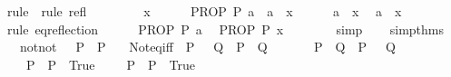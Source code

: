 \begin{isabellebody}
\ {\isacharparenleft}{\kern0pt}rule\ {\isacharasterisk}{\kern0pt}{\isacharparenright}{\kern0pt}\ {\isacharparenleft}{\kern0pt}rule\ refl{\isacharparenright}{\kern0pt}\isanewline
\ \ \isamarkupfalse%
\isanewline
\ \ \ \ \isamarkupfalse%
\ x\isanewline
\ \ \ \ \isamarkupfalse%
\ {\isacartoucheopen}PROP\ P\ a{\isacartoucheclose}\ \ {\isacartoucheopen}a\ {\isacharequal}{\kern0pt}\ x{\isacartoucheclose}\isanewline
\ \ \ \ \isamarkupfalse%
\ {\isacartoucheopen}a\ {\isacharequal}{\kern0pt}\ x{\isacartoucheclose}\ \isamarkupfalse%
\ {\isacartoucheopen}a\ {\isasymequiv}\ x{\isacartoucheclose}\isanewline
\ \ \ \ \ \ \isamarkupfalse%
\ {\isacharparenleft}{\kern0pt}rule\ eq{\isacharunderscore}{\kern0pt}reflection{\isacharparenright}{\kern0pt}\isanewline
\ \ \ \ \isamarkupfalse%
\ {\isacartoucheopen}PROP\ P\ a{\isacartoucheclose}\ \isamarkupfalse%
\ {\isacartoucheopen}PROP\ P\ x{\isacartoucheclose}\isanewline
\ \ \ \ \ \ \isamarkupfalse%
\ simp\isanewline
\ \ \isamarkupfalse%
\isanewline
{}\isamarkupfalse%
%
\endisatagproof
{\isafoldproof}%
%
\isadelimproof
\isanewline
%
\endisadelimproof
\isanewline
{}\isamarkupfalse%
\ simp{\isacharunderscore}{\kern0pt}thms{\isacharcolon}{\kern0pt}\isanewline
\ \ \ not{\isacharunderscore}{\kern0pt}not{\isacharcolon}{\kern0pt}\ {\isachardoublequoteopen}{\isacharparenleft}{\kern0pt}{\isasymnot}\ {\isasymnot}\ P{\isacharparenright}{\kern0pt}\ {\isacharequal}{\kern0pt}\ P{\isachardoublequoteclose}\isanewline
\ \ \ Not{\isacharunderscore}{\kern0pt}eq{\isacharunderscore}{\kern0pt}iff{\isacharcolon}{\kern0pt}\ {\isachardoublequoteopen}{\isacharparenleft}{\kern0pt}{\isacharparenleft}{\kern0pt}{\isasymnot}\ P{\isacharparenright}{\kern0pt}\ {\isacharequal}{\kern0pt}\ {\isacharparenleft}{\kern0pt}{\isasymnot}\ Q{\isacharparenright}{\kern0pt}{\isacharparenright}{\kern0pt}\ {\isacharequal}{\kern0pt}\ {\isacharparenleft}{\kern0pt}P\ {\isacharequal}{\kern0pt}\ Q{\isacharparenright}{\kern0pt}{\isachardoublequoteclose}\isanewline
\ \ \isanewline
\ \ \ \ {\isachardoublequoteopen}{\isacharparenleft}{\kern0pt}P\ {\isasymnoteq}\ Q{\isacharparenright}{\kern0pt}\ {\isacharequal}{\kern0pt}\ {\isacharparenleft}{\kern0pt}P\ {\isacharequal}{\kern0pt}\ {\isacharparenleft}{\kern0pt}{\isasymnot}\ Q{\isacharparenright}{\kern0pt}{\isacharparenright}{\kern0pt}{\isachardoublequoteclose}\isanewline
\ \ \ \ {\isachardoublequoteopen}{\isacharparenleft}{\kern0pt}P\ {\isasymor}\ {\isasymnot}P{\isacharparenright}{\kern0pt}\ {\isacharequal}{\kern0pt}\ True{\isachardoublequoteclose}\ \ \ \ {\isachardoublequoteopen}{\isacharparenleft}{\kern0pt}{\isasymnot}\ P\ {\isasymor}\ P{\isacharparenright}{\kern0pt}\ {\isacharequal}{\kern0pt}\ True{\isachardoublequoteclose}\isanewline

\end{isabellebody}
